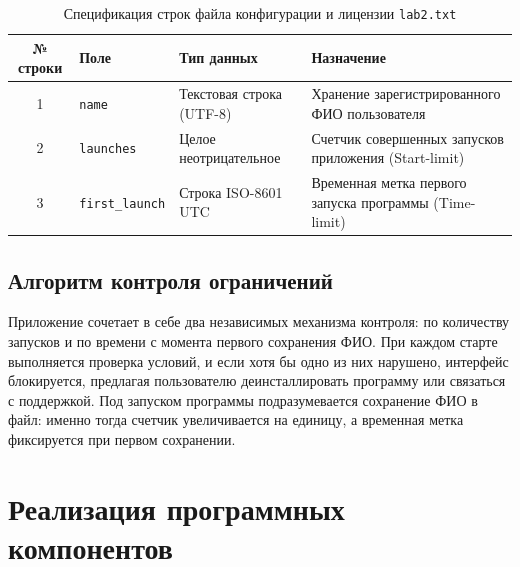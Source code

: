 \documentclass[a4paper]{article}
\begin{document}
\begin{table}[h!]
    \caption{Спецификация строк файла конфигурации и лицензии \texttt{lab2.txt}}
    \label{tab:conf_spec}
    \small
    \begin{tabularx}{\textwidth}{|c|l|p{4cm}|X|}
        \hline
        \textbf{№ строки} & \textbf{Поле}          & \textbf{Тип данных}      & \textbf{Назначение}                                    \\ \hline
        1                 & \texttt{name}          & Текстовая строка (UTF-8) & Хранение зарегистрированного ФИО пользователя          \\ \hline
        2                 & \texttt{launches}      & Целое неотрицательное    & Счетчик совершенных запусков приложения (Start-limit)  \\ \hline
        3                 & \texttt{first\_launch} & Строка ISO-8601 UTC      & Временная метка первого запуска программы (Time-limit) \\ \hline
    \end{tabularx}
\end{table}

\subsection{Алгоритм контроля ограничений}
Приложение сочетает в себе два независимых механизма контроля: по количеству запусков и по времени с момента первого сохранения ФИО.
При каждом старте выполняется проверка условий, и если хотя бы одно из них нарушено, интерфейс блокируется, предлагая пользователю деинсталлировать программу или связаться с поддержкой. Под запуском программы подразумевается сохранение ФИО в файл: именно тогда счетчик увеличивается на единицу, а временная метка фиксируется при первом сохранении.


\newpage
\section{Реализация программных компонентов}
\end{document}
